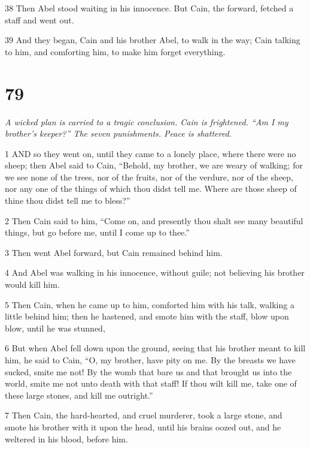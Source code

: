 \par 38 Then Abel stood waiting in his innocence. But Cain, the forward, fetched a staff and went out.

\par 39 And they began, Cain and his brother Abel, to walk in the way; Cain talking to him, and comforting him, to make him forget everything.

\chapter{79}

\par \textit{A wicked plan is carried to a tragic conclusion. Cain is frightened. “Am I my brother's keeper?” The seven punishments. Peace is shattered.}

\par 1 AND so they went on, until they came to a lonely place, where there were no sheep; then Abel said to Cain, “Behold, my brother, we are weary of walking; for we see none of the trees, nor of the fruits, nor of the verdure, nor of the sheep, nor any one of the things of which thou didst tell me. Where are those sheep of thine thou didst tell me to bless?”

\par 2 Then Cain said to him, “Come on, and presently thou shalt see many beautiful things, but go before me, until I come up to thee.”

\par 3 Then went Abel forward, but Cain remained behind him.

\par 4 And Abel was walking in his innocence, without guile; not believing his brother would kill him.

\par 5 Then Cain, when he came up to him, comforted him with his talk, walking a little behind him; then he hastened, and smote him with the staff, blow upon blow, until he was stunned,

\par 6 But when Abel fell down upon the ground, seeing that his brother meant to kill him, he said to Cain, “O, my brother, have pity on me. By the breasts we have sucked, smite me not! By the womb that bare us and that brought us into the world, smite me not unto death with that staff! If thou wilt kill me, take one of these large stones, and kill me outright.”

\par 7 Then Cain, the hard-hearted, and cruel murderer, took a large stone, and smote his brother with it upon the head, until his brains oozed out, and he weltered in his blood, before him.

